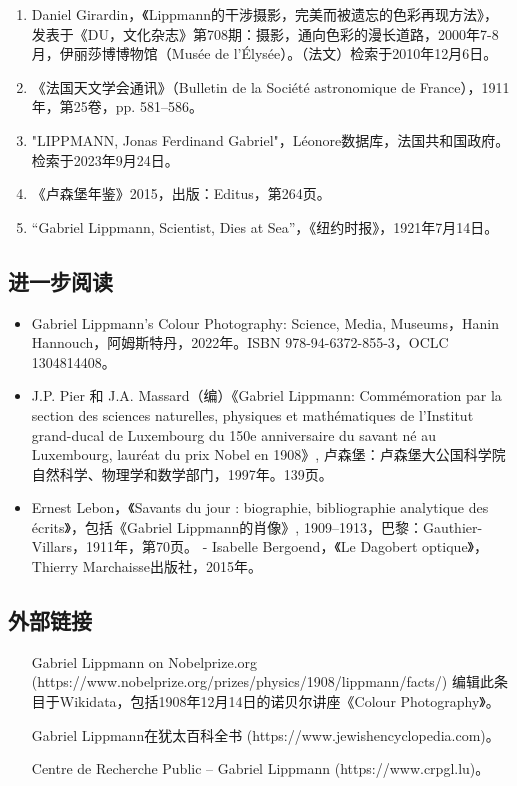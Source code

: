 \begin{enumerate}
\item Daniel Girardin，《Lippmann的干涉摄影，完美而被遗忘的色彩再现方法》，发表于《DU，文化杂志》第708期：摄影，通向色彩的漫长道路，2000年7-8月，伊丽莎博博物馆（Musée de l'Élysée）。（法文）检索于2010年12月6日。
\item 《法国天文学会通讯》（Bulletin de la Société astronomique de France），1911年，第25卷，pp. 581–586。
\item "LIPPMANN, Jonas Ferdinand Gabriel"，Léonore数据库，法国共和国政府。检索于2023年9月24日。
\item 《卢森堡年鉴》2015，出版：Editus，第264页。
\item “Gabriel Lippmann, Scientist, Dies at Sea”，《纽约时报》，1921年7月14日。
\end{enumerate}
\subsection{进一步阅读}
\begin{itemize}
\item Gabriel Lippmann's Colour Photography: Science, Media, Museums，Hanin Hannouch，阿姆斯特丹，2022年。ISBN 978-94-6372-855-3，OCLC 1304814408。
\item J.P. Pier 和 J.A. Massard（编）《Gabriel Lippmann: Commémoration par la section des sciences naturelles, physiques et mathématiques de l’Institut grand-ducal de Luxembourg du 150e anniversaire du savant né au Luxembourg, lauréat du prix Nobel en 1908》, 卢森堡：卢森堡大公国科学院自然科学、物理学和数学部门，1997年。139页。
\item Ernest Lebon，《Savants du jour : biographie, bibliographie analytique des écrits》，包括《Gabriel Lippmann的肖像》, 1909–1913，巴黎：Gauthier-Villars，1911年，第70页。
- Isabelle Bergoend，《Le Dagobert optique》，Thierry Marchaisse出版社，2015年。
\end{itemize}
\subsection{外部链接}
\begin{itemize}
\item [Gabriel Lippmann on Nobelprize.org](https://www.nobelprize.org/prizes/physics/1908/lippmann/facts/) 编辑此条目于Wikidata，包括1908年12月14日的诺贝尔讲座《Colour Photography》。
\item [Gabriel Lippmann在犹太百科全书](https://www.jewishencyclopedia.com)。
\item [Centre de Recherche Public – Gabriel Lippmann](https://www.crpgl.lu)。
\end{itemize}